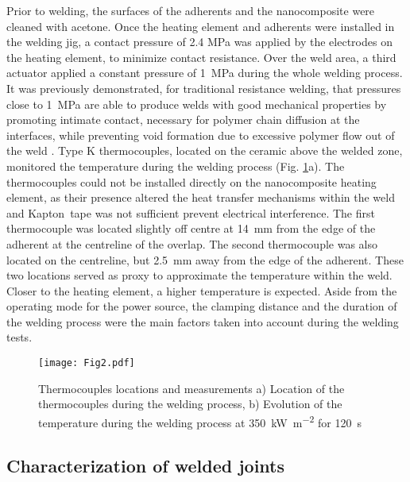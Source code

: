 Prior to welding, the surfaces of the adherents and the nanocomposite were cleaned with acetone. 
Once the heating element and adherents were installed in the welding jig, a contact pressure of 2.4 MPa was applied by the electrodes on the heating element, to minimize contact resistance. 
Over the weld area, a third actuator applied a constant pressure of \SI{1}{\MPa} during the whole welding process. 
It was previously demonstrated, for traditional resistance welding, that pressures close to \SI{1}{\MPa} are able to produce welds with good mechanical properties by promoting intimate contact, necessary for polymer chain diffusion at the interfaces, while preventing void formation due to excessive polymer flow out of the weld \cite{Ageorges2000a, Dube2007, Shi2014}. 
Type K thermocouples, located on the ceramic above the welded zone, monitored the temperature during the welding process (Fig. \ref{fig:thermocouple}a). 
The thermocouples could not be installed directly on the nanocomposite heating element, as their presence altered the heat transfer mechanisms within the weld and Kapton\textregistered \ tape was not sufficient prevent electrical interference. 
The first thermocouple was located slightly off centre at \SI{14}{\milli\metre} from the edge of the adherent at the centreline of the overlap. 
The second thermocouple was also located on the centreline, but \SI{2.5}{\milli\metre} away from the edge of the adherent. 
These two locations served as proxy to approximate the temperature within the weld. 
Closer to the heating element, a higher temperature is expected. 
Aside from the operating mode for the power source, the clamping distance and the duration of the welding process were the main factors taken into account during the welding tests. 

\begin{figure}[b!]
	\centering
	\texttt{[image: Fig2.pdf]}
	\caption{Thermocouples locations and measurements a) Location of the thermocouples during the welding process, b) Evolution of the temperature during the welding process at \SI{350}{\kilo\watt\per\square\metre} for \SI{120}{\second} \cite{Brassard2018_figshare_article1}}
	\label{fig:thermocouple}
\end{figure}

\FloatBarrier
\subsection{Characterization of welded joints}


